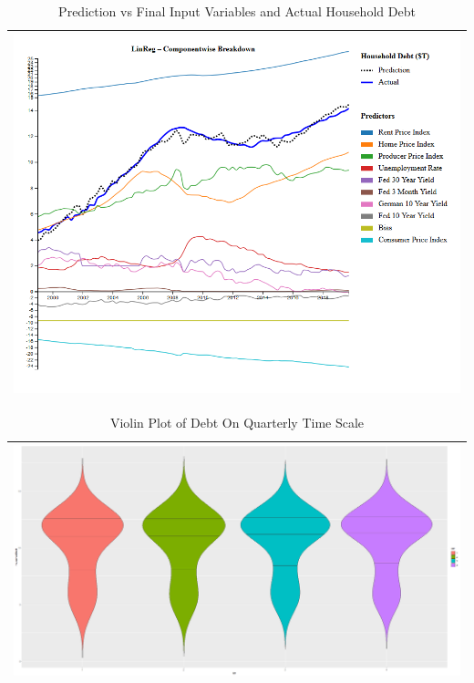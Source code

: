 \documentclass[sigconf,nonacm,11pt]{acmart}
\begin{document}
\begin{appendix}
\begin{table}[ht]
\caption{Prediction vs Final Input Variables and Actual Household Debt}
\centering
\begin{tabular}{p{1.0\linewidth}}
\hline
\includegraphics[scale = 0.27]{linreg.png}\\
\hline
\end{tabular}
\end{table}


\begin{table}[ht]
\caption{Violin Plot of Debt On Quarterly Time Scale}
\centering
\begin{tabular}{p{1.0\linewidth}}
\hline
\includegraphics[scale = 0.24]{QtrVSHouseholdDebt_violinPlot.png}\\
\hline
\end{tabular}
\end{table}


\end{appendix}
\end{document}
